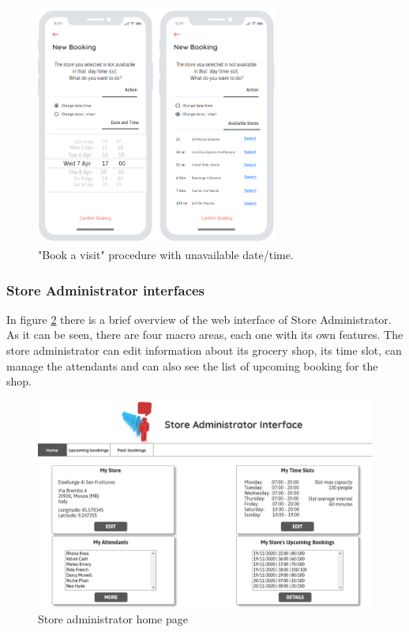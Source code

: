 \documentclass[table, 12pt]{article}
\begin{document}
\begin{figure}[H]
    \begin{center}
        \includegraphics[width=225pt]{assets/Mockups/mock_new_booking_unavailable.png}
        \caption{"Book a visit" procedure with unavailable date/time.}
        \label{mock_new_booking_unavailable}
    \end{center}
\end{figure}

\subsubsection{Store Administrator interfaces}
In figure \ref{mock_store_admin_home} there is a brief overview of the web interface of Store Administrator.
As it can be seen, there are four macro areas, each one with its own features.
The store administrator can edit information about its grocery shop, its time slot, can manage the attendants and can also see the list of upcoming booking for the shop.
\begin{figure}[H]
    \includegraphics[width=\textwidth]{assets/Mockups/mock_home_store_admin.png}
    \caption{Store administrator home page}
    \label{mock_store_admin_home}
\end{figure}
\end{document}
